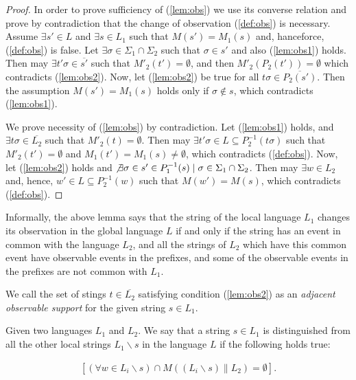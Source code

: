 \documentclass[a4paper, 10pt, conference]{ieeeconf}
\begin{document}
\begin{proof}
In order to prove sufficiency of (\ref{lem:obs}) we use its converse relation
and prove by contradiction that the change of observation (\ref{def:obs}) is
necessary.
Assume $\exists s' \in L$ and $\exists s \in L_1$ such that
$M(s')= M_1(s)$ and, hanceforce, (\ref{def:obs}) is false. Let $\exists
\sigma \in \Sigma_1 \cap \Sigma_2$ such that $\sigma \in s'$ and also
(\ref{lem:obs1}) holds. Then may $\exists t'\sigma \in \overline{s'}$ such that
$M'_2(t') = \emptyset$, and then $M'_2(P_2(t')) =
\emptyset$ which contradicts (\ref{lem:obs2}). Now, let (\ref{lem:obs2})
be true for all $t\sigma \in \overline{P_2(s')}$. Then the assumption $M(s')=
M_1(s)$ holds only if $\sigma \not \in s$, which contradicts (\ref{lem:obs1}). 

We prove necessity of (\ref{lem:obs}) by contradiction.
Let (\ref{lem:obs1}) holds, and $\exists t\sigma \in \overline{L_2}$ such that
$M'_2(t) = \emptyset$. Then may $\exists t'\sigma \in 
L \subseteq P_2^{-1}(t\sigma)$ such that $M'_2(t') =
\emptyset$ and $M_1(t') = M_1(s) \neq \emptyset$, which contradicts
(\ref{def:obs}).
Now, let (\ref{lem:obs2}) holds and $\not \exists \sigma \in s' \in P_1^{-1}(s)
\mid \sigma \in \Sigma_1 \cap \Sigma_2$. Then may $\exists w \in L_2$ and,
hence, $w' \in L \subseteq P_2^{-1}(w)$ such that $M(w')=M(s)$,
which contradicts (\ref{def:obs}).
\end{proof}

Informally, the above lemma says that the string of the local language $L_1$
changes its observation in the global language $L$ if and only if the string has
an event in common with the language $L_2$, and all the strings of $L_2$ which
have this common event have observable events in the prefixes, and some of the
observable events in the prefixes are not common with $L_1$.

We call the set of stings $t \in \overline{L_2}$ satisfying condition
(\ref{lem:obs2}) as an \emph{adjacent observable support} for the given string
$s \in L_1$.

\begin{definition} Given two languages $L_1$ and $L_2$. We say that a string $s
\in L_{1}$ is distinguished from all the other local strings $L_1\backslash s$
in the language $L$ if the following holds true:
\end{definition}
\begin{equation}
\label{def:dist}
\begin{array}{l}
	\left[
		(\forall w \in L_i\backslash s) \cap M((L_i\backslash s) \parallel L_2) 
		= \emptyset
	\right].
\end{array}
\end{equation}
\end{document}
